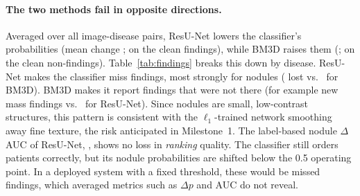 \documentclass[11pt]{article}
\begin{document}
\begin{table}[htbp]
\centering
\caption{ResU-Net vs.\ Anscombe-BM3D on the same \NTest{} test images. Difference = ResU-Net minus BM3D, with paired-bootstrap 95\% CI; Wilcoxon signed-rank $p$ for per-image metrics; ``Better'' names the winner when the CI excludes 0. Arrows show which direction is better.}
\label{tab:compare}
\resizebox{\linewidth}{!}{}
\end{table}

\paragraph{The two methods fail in opposite directions.} Averaged over all image-disease pairs, ResU-Net lowers the classifier's probabilities (mean change \OursShiftAll; \OursShiftFindings{} on the clean findings), while BM3D raises them (\BMShiftAll; \BMShiftNonFindings{} on the clean non-findings). Table~\ref{tab:findings} breaks this down by disease. ResU-Net makes the classifier miss findings, most strongly for nodules (\OursLostNodule{} lost vs.\ \BMLostNodule{} for BM3D). BM3D makes it report findings that were not there (for example \BMNewMass{} new mass findings vs.\ \OursNewMass{} for ResU-Net). Since nodules are small, low-contrast structures, this pattern is consistent with the $\ell_1$-trained network smoothing away fine texture, the risk anticipated in Milestone~1. The label-based nodule $\Delta$AUC of ResU-Net, \OursNoduleDAUC{} \OursNoduleDAUCci, shows no loss in \emph{ranking} quality. The classifier still orders patients correctly, but its nodule probabilities are shifted below the 0.5 operating point. In a deployed system with a fixed threshold, these would be missed findings, which averaged metrics such as $\Delta p$ and AUC do not reveal.

\begin{table}[htbp]
\centering
\caption{Lost and new findings per disease (share of the classifier's clean-image findings that disappear, and of its clean-image non-findings that become findings), sorted by the number of clean-image findings. Bold marks the lower (better) value of the two methods. Diseases with few clean findings (bottom rows) give unstable rates.}
\label{tab:findings}
\small

\end{table}

\begin{table}[htbp]
\centering
\caption{Per-disease $\Delta$AUC (AUC on clean minus AUC after processing) with paired-bootstrap 95\% CI, for diseases with at least \MinPos{} test cases (number in brackets).}
\label{tab:dauc}
\resizebox{\linewidth}{!}{}
\end{table}
\end{document}

